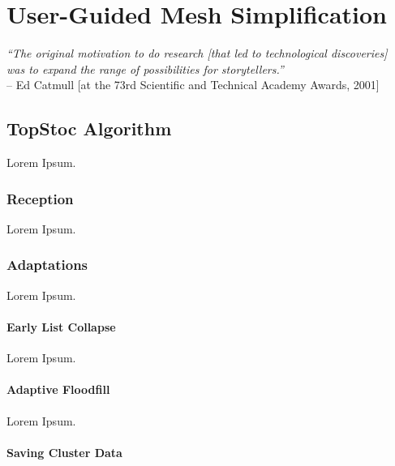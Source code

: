 \chapter{User-Guided Mesh Simplification}
\label{topstoc0}

\begin{flushright}
\textit{``The original motivation to do research [that led to technological discoveries]\\was to expand the range of possibilities for storytellers.''}\\
-- Ed Catmull {[}at the 73rd Scientific and Technical Academy Awards, 2001{]}
\end{flushright}


\section{TopStoc Algorithm}
\label{topstoc1}

Lorem Ipsum.

\subsection{Reception}
\label{topstoc11}

Lorem Ipsum.

\subsection{Adaptations}
\label{topstoc12}

Lorem Ipsum.

\subsubsection{Early List Collapse}
\label{topstoc121}

Lorem Ipsum.

\subsubsection{Adaptive Floodfill}
\label{topstoc122}

Lorem Ipsum.

\subsubsection{Saving Cluster Data}
\label{topstoc123}


